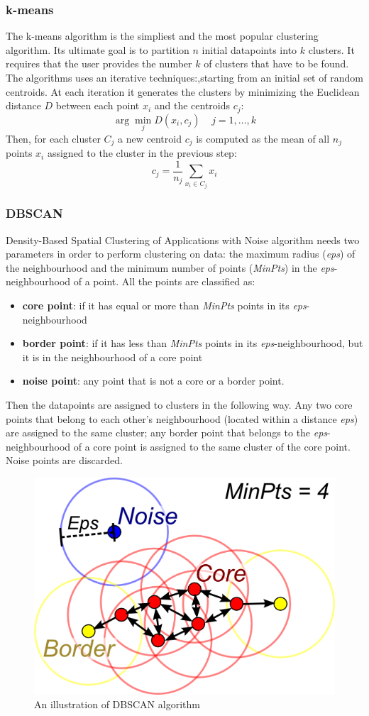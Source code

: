 \documentclass[11pt]{article}
\begin{document}
\subsubsection{k-means}
The k-means algorithm is the simpliest and the most popular clustering algorithm. Its ultimate goal is to partition $n$ initial datapoints into $k$ clusters. It requires that the user provides the number $k$ of clusters that have to be found. The algorithms uses an iterative techniques:,starting from an initial set of random centroids. At each iteration it generates the clusters by minimizing the Euclidean distance $D$ between each point $x_i$  and  the centroids $c_j$:  
$$\arg \min\limits_{j}D(x_i, c_j)\;\;\;\; j = 1, \dots, k$$
Then, for each cluster $C_j$ a new centroid $c_j$ is computed as the mean of all $n_j$ points $x_i$ assigned to the cluster in the previous step: 
$$c_j = \frac{1}{n_j} \sum_{x_i \in C_j} x_i$$

\subsubsection{DBSCAN}
Density-Based Spatial Clustering of Applications with Noise algorithm needs two parameters in order to perform clustering on data: the maximum radius (\textit{eps}) of the neighbourhood and the minimum number of points (\textit{MinPts}) in the \textit{eps}-neighbourhood of a point. All the points are classified as: 
\begin{itemize}
	\item \textbf{core point}: if it has equal or more than \textit{MinPts} points in its  \textit{eps}-neighbourhood 
	\item \textbf{border point}: if it has less than \textit{MinPts} points in its  \textit{eps}-neighbourhood, but it is in the neighbourhood of a core point
	\item \textbf{noise point}: any point that is not a core or a border point.
\end{itemize} 
Then the datapoints are assigned to clusters in the following way. Any two core points that belong to each other's neighbourhood (located within a distance \textit{eps}) are assigned to the same cluster; any border point that belongs to the \textit{eps}-neighbourhood of a core point is assigned to the same cluster of the core point. Noise points are discarded. 

\begin{figure}[h]
	\centering
	\includegraphics[width=0.4\linewidth]{dbscan}
	\caption{An illustration of DBSCAN algorithm}
	\label{fig:dbscan}
\end{figure}
\end{document}
